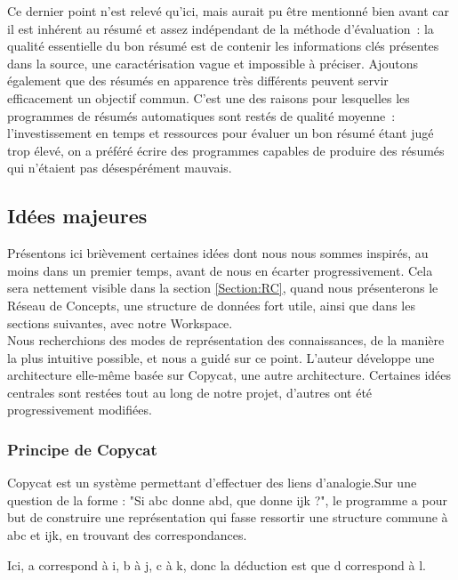 \documentclass[a4paper, 12pt]{article}
\begin{document}
  Ce dernier point n'est relevé qu'ici, mais aurait pu être mentionné bien avant car il est inhérent au résumé et assez indépendant de la méthode d'évaluation~: la qualité essentielle du bon résumé est de contenir les informations clés présentes dans la source, une caractérisation vague et impossible à préciser. Ajoutons également que des résumés en apparence très différents peuvent servir efficacement un objectif commun. C'est une des raisons pour lesquelles les programmes de résumés automatiques sont restés de qualité moyenne~: l'investissement en temps et ressources pour évaluer un bon résumé étant jugé trop élevé, on a préféré écrire des programmes capables de produire des résumés qui n'étaient pas désespérément mauvais.

 
\subsection{Idées majeures}

Présentons ici brièvement certaines idées dont nous nous sommes inspirés, au moins dans un premier temps, avant de nous en écarter progressivement. Cela sera nettement visible dans la section \ref{Section:RC}, quand nous présenterons le Réseau de Concepts, une structure de données fort utile, ainsi que dans les sections suivantes, avec notre Workspace.\\

Nous recherchions des modes de représentation des connaissances, de la manière la plus intuitive possible, et \cite{parmentier_specification_1998} nous a guidé sur ce point. L'auteur développe une architecture elle-même basée sur Copycat, une autre architecture. Certaines idées centrales sont restées tout au long de notre projet, d'autres ont été progressivement modifiées.

\subsubsection{Principe de Copycat}

Copycat est un système permettant d'effectuer des liens d'analogie.Sur une question de la forme : "Si abc donne abd, que donne ijk ?", le programme a pour but de construire une représentation qui fasse ressortir une structure commune à abc et ijk, en trouvant des correspondances.

Ici, a correspond à i, b à j, c à k, donc la déduction est que d correspond à l.
\end{document}
